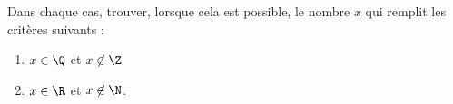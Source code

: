 
Dans chaque cas, trouver, lorsque cela est possible, le nombre $x$ qui remplit les critères suivants :
\begin{enumerate}
\item $x \in \Q$ et $x \not\in \Z$
\item $x \in \R$ et $x \not\in \N$. 
\end{enumerate}
